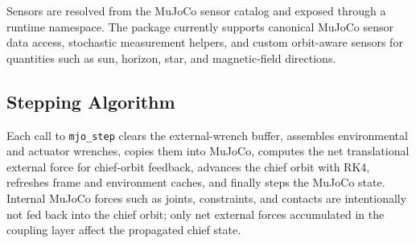 Sensors are resolved from the MuJoCo sensor catalog and exposed through a
runtime namespace. The package currently supports canonical MuJoCo sensor
data access, stochastic measurement helpers, and custom orbit-aware sensors
for quantities such as sun, horizon, star, and magnetic-field directions.

\subsection{Stepping Algorithm}

Each call to \texttt{mjo\_step} clears the external-wrench buffer, assembles
environmental and actuator wrenches, copies them into MuJoCo, computes the
net translational external force for chief-orbit feedback, advances the
chief orbit with RK4, refreshes frame and environment caches, and finally
steps the MuJoCo state. Internal MuJoCo forces such as joints, constraints,
and contacts are intentionally not fed back into the chief orbit; only net
external forces accumulated in the coupling layer affect the propagated
chief state.
